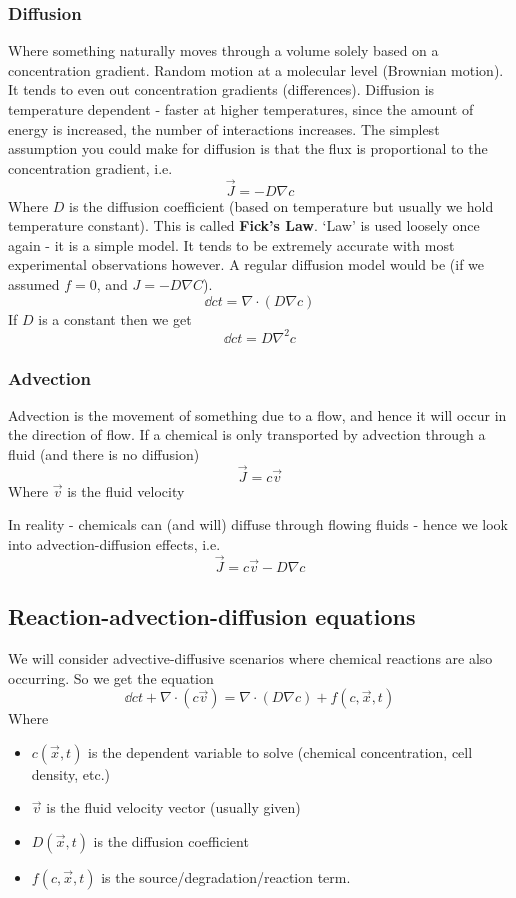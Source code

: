 \documentclass{X:/Documents/Coding/Latex/myassignment}
\begin{document}
\subsubsection{Diffusion}
Where something naturally moves through a volume solely based on a concentration gradient. Random motion at a molecular level (Brownian motion). It tends to even out concentration gradients (differences). 
Diffusion is temperature dependent - faster at higher temperatures, since the amount of energy is increased, the number of interactions increases.
The simplest assumption you could make for diffusion is that the flux is proportional to the concentration gradient, i.e.
\[\vec J = -D \nabla c\]
Where $D$ is the diffusion coefficient (based on temperature but usually we hold temperature constant). This is called \textbf{Fick's Law}. `Law' is used loosely once again - it is a simple model. It tends to be extremely accurate with most experimental observations however.
A regular diffusion model would be (if we assumed $f = 0$, and $J = -D \nabla C$).
\[\dd ct = \nabla \cdot (D \nabla c)\]
If $D$ is a constant then we get
\[\dd ct = D \nabla^2 c\]

\subsubsection{Advection}
Advection is the movement of something due to a flow, and hence it will occur in the direction of flow.
If a chemical is only transported by advection through a fluid (and there is no diffusion)
\[\vec J = c\vec v\]
Where $\vec v$ is the fluid velocity

In reality - chemicals can (and will) diffuse through flowing fluids - hence we look into advection-diffusion effects, i.e.
\[\vec J = c\vec v - D\nabla c\]
\subsection{Reaction-advection-diffusion equations}
We will consider advective-diffusive scenarios where chemical reactions are also occurring. 
So we get the equation
\[\dd ct + \nabla \cdot(c\vec v) = \nabla \cdot(D \nabla c) + f(c,\vec x,t)\]
Where
\begin{itemize}
	\item $c(\vec x,t)$ is the dependent variable to solve (chemical concentration, cell density, etc.)
	\item $\vec v$ is the fluid velocity vector (usually given)
	\item $D(\vec x,t)$ is the diffusion coefficient
	\item $f(c,\vec x,t)$ is the source/degradation/reaction term.
\end{itemize}
\end{document}
